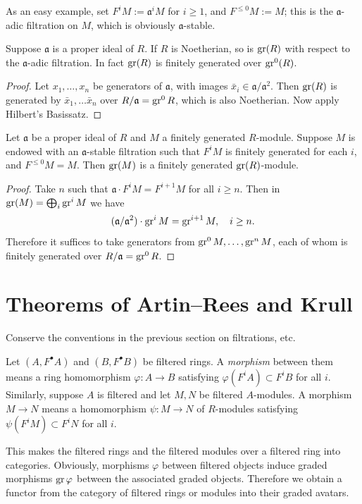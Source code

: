 As an easy example, set $F^i M := \mathfrak{a}^i M$ for $i \geq 1$, and $F^{\leq 0} M := M$; this is the $\mathfrak{a}$-adic filtration on $M$, which is obviously $\mathfrak{a}$-stable.

\begin{proposition}\label{prop:gr-Noetherian}
	Suppose $\mathfrak{a}$ is a proper ideal of $R$. If $R$ is Noetherian, so is $\operatorname{gr}(R)$ with respect to the $\mathfrak{a}$-adic filtration. In fact $\operatorname{gr}(R)$ is finitely generated over $\operatorname{gr}^0(R)$.
\end{proposition}
\begin{proof}
	Let $x_1, \ldots, x_n$ be generators of $\mathfrak{a}$, with images $\bar{x}_i \in \mathfrak{a}/\mathfrak{a}^2$. Then $\operatorname{gr}(R)$ is generated by $\bar{x}_1, \ldots \bar{x}_n$ over $R/\mathfrak{a} = \operatorname{gr}^0 R$, which is also Noetherian. Now apply Hilbert's Basissatz.
\end{proof}

\begin{proposition}\label{prop:gr-fg}
	Let $\mathfrak{a}$ be a proper ideal of $R$ and $M$ a finitely generated $R$-module. Suppose $M$ is endowed with an $\mathfrak{a}$-stable filtration such that $F^i M$ is finitely generated for each $i$, and $F^{\leq 0} M = M$. Then $\operatorname{gr}(M)$ is a finitely generated $\operatorname{gr}(R)$-module.
\end{proposition}
\begin{proof}
	Take $n$ such that $\mathfrak{a} \cdot F^i M = F^{i+1} M$ for all $i \geq n$. Then in $\operatorname{gr}(M) = \bigoplus_i \operatorname{gr}^i M$ we have
	\[ (\mathfrak{a}/\mathfrak{a}^2) \cdot \operatorname{gr}^i M = \operatorname{gr}^{i+1} M, \quad i \geq n. \]
	Therefore it suffices to take generators from $\operatorname{gr}^0 M, \ldots, \operatorname{gr}^n M$, each of whom is finitely generated over $R/\mathfrak{a} = \operatorname{gr}^0 R$.
\end{proof}

\section{Theorems of Artin--Rees and Krull}\label{sec:Artin-Rees}
Conserve the conventions in the previous section on filtrations, etc.

\begin{definition}
	Let $(A, F^\bullet A)$ and $(B, F^\bullet B)$ be filtered rings. A \emph{morphism} between them means a ring homomorphism $\varphi: A \to B$ satisfying $\varphi(F^i A) \subset F^i B$ for all $i$. Similarly, suppose $A$ is filtered and let $M, N$ be filtered $A$-modules. A morphism $M \to N$ means a homomorphism $\psi: M \to N$ of $R$-modules satisfying $\psi(F^i M) \subset F^i N$ for all $i$.
\end{definition}
This makes the filtered rings and the filtered modules over a filtered ring into categories. Obviously, morphisms $\varphi$ between filtered objects induce graded morphisms $\operatorname{gr} \varphi$ between the associated graded objects. Therefore we obtain a functor from the category of filtered rings or modules into their graded avatars.

